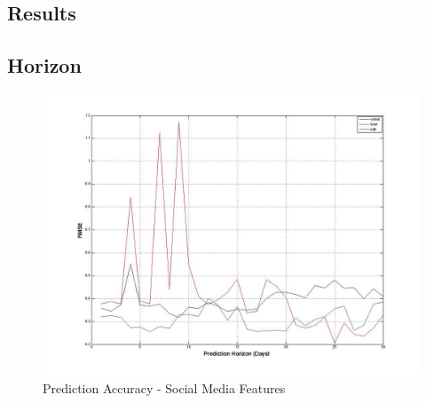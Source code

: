 \subsection{Results}









\subsection{Horizon}




\begin{figure}[H]
        \centering
         \includegraphics[width=1\textwidth ]{img/model/exp2/result}      
        \caption{Prediction Accuracy - Social Media Features }
        \label{fig:gnn_fuzz}
\end{figure}






